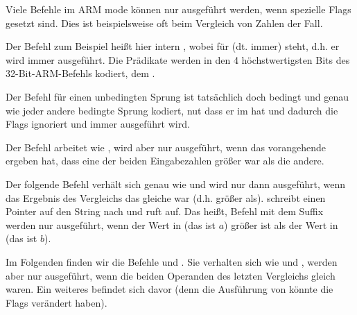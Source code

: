 \label{subsec:jcc_ARM}

\mysubparagraph{\OptimizingKeilVI (\ARMMode)}



Viele Befehle im ARM mode können nur ausgeführt werden, wenn spezielle Flags gesetzt sind.
Dies ist beispielsweise oft beim Vergleich von Zahlen der Fall.

Der \ADD Befehl zum Beispiel heißt hier intern , wobei  für  (dt. immer) steht, d.h. er wird
immer ausgeführt.
Die Prädikate werden in den 4 höchstwertigsten Bits des 32-Bit-ARM-Befehls kodiert, dem .

Der Befehl  für einen unbedingten Sprung ist tatsächlich doch bedingt und genau wie jeder andere bedingte Sprung
kodiert, nut dass er  im  hat und dadurch die Flags ignoriert und immer ausgeführt wird.

Der Befehl  arbeitet wie , wird aber nur ausgeführt, wenn das vorangehende \CMP ergeben hat, dass eine
der beiden Eingabezahlen größer war als die andere. 

Der folgende  Befehl verhält sich genau wie  und wird nur dann ausgeführt, wenn das Ergebnis des
Vergleichs das gleiche war (d.h. größer als).
 schreibt einen Pointer auf den String  nach  und  ruft \printf auf.
Das heißt, Befehl mit dem Suffix  werden nur ausgeführt, wenn der Wert in  (das ist $a$) größer ist als
der Wert in  (das ist $b$).

Im Folgenden finden wir die Befehle  und .
Sie verhalten sich wie  und , werden aber nur ausgeführt, wenn die beiden Operanden des letzten
Vergleichs gleich waren.
Ein weiteres \CMP befindet sich davor (denn die Ausführung von \printf könnte die Flags verändert haben).

